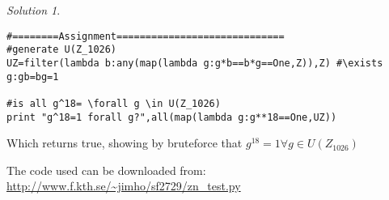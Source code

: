 \documentclass[a4paper,twoside=false,abstract=false,numbers=noenddot,
titlepage=false,headings=small,parskip=half,version=last]{scrartcl}
\theoremstyle{definition}
\theoremstyle{remark}
\newtheorem*{solution}{Solution}
\begin{document}
\begin{solution}
\begin{verbatim}
#========Assignment=============================
#generate U(Z_1026)
UZ=filter(lambda b:any(map(lambda g:g*b==b*g==One,Z)),Z) #\exists g:gb=bg=1

#is all g^18= \forall g \in U(Z_1026)
print "g^18=1 forall g?",all(map(lambda g:g**18==One,UZ)) 
\end{verbatim}

Which returns true, showing by bruteforce that $g^{18}=1 \forall g \in U(Z_{1026})$

The code used can be downloaded from:\\
\url{http://www.f.kth.se/~jimho/sf2729/zn_test.py}

\end{solution}


\end{document}
